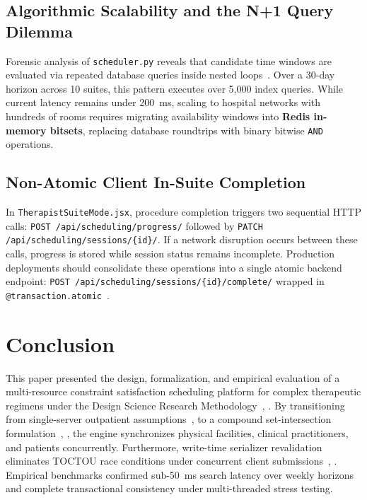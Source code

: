 \documentclass[conference]{IEEEtran}
\begin{document}
\subsection{Algorithmic Scalability and the N+1 Query Dilemma}
Forensic analysis of \texttt{scheduler.py} reveals that candidate time windows are evaluated via repeated database queries inside nested loops~\cite{panda2022concurrency}. Over a 30-day horizon across 10 suites, this pattern executes over 5,000 index queries. While current latency remains under 200~ms, scaling to hospital networks with hundreds of rooms requires migrating availability windows into \textbf{Redis in-memory bitsets}, replacing database roundtrips with binary bitwise \texttt{AND} operations.

\subsection{Non-Atomic Client In-Suite Completion}
In \texttt{TherapistSuiteMode.jsx}, procedure completion triggers two sequential HTTP calls: \texttt{POST /api/scheduling/progress/} followed by \texttt{PATCH /api/scheduling/sessions/\{id\}/}. If a network disruption occurs between these calls, progress is stored while session status remains incomplete. Production deployments should consolidate these operations into a single atomic backend endpoint: \texttt{POST /api/scheduling/sessions/\{id\}/complete/} wrapped in \texttt{@transaction.atomic}~\cite{panda2022concurrency}.

\section{Conclusion}

This paper presented the design, formalization, and empirical evaluation of a multi-resource constraint satisfaction scheduling platform for complex therapeutic regimens under the Design Science Research Methodology~\cite{peffers2007design}, \cite{hevner2004design}. By transitioning from single-server outpatient assumptions~\cite{cayirli2003outpatient}, \cite{gupta2008appointment} to a compound set-intersection formulation~\cite{allen1983maintaining}, \cite{golumbic2004algorithmic}, the engine synchronizes physical facilities, clinical practitioners, and patients concurrently. Furthermore, write-time serializer revalidation eliminates TOCTOU race conditions under concurrent client submissions~\cite{bishop1996checking}, \cite{panda2022concurrency}. Empirical benchmarks confirmed sub-50~ms search latency over weekly horizons and complete transactional consistency under multi-threaded stress testing.
\end{document}
